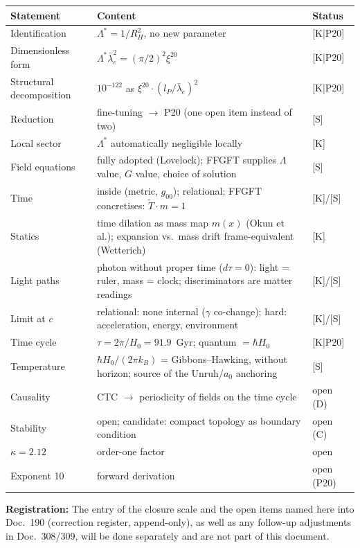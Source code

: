 \documentclass[11pt]{report}
\begin{document}
\begin{center}
\begin{tabular}{lp{6.5cm}l}
\toprule
Statement & Content & Status \\
\midrule
Identification & $\Lambda^{*} = 1/R_H^2$, no new parameter
  & [K|P20] \\
Dimensionless form & $\Lambda^{*}\bar\lambda_e^2 = (\pi/2)^2\xi^{20}$
  & [K|P20] \\
Structural decomposition & $10^{-122}$ as $\xi^{20}\cdot(l_P/\bar\lambda_e)^2$
  & [K|P20] \\
Reduction & fine-tuning $\to$ P20 (one open item instead of two)
  & [S] \\
Local sector & $\Lambda^{*}$ automatically negligible locally
  & [K] \\
Field equations & fully adopted (Lovelock); FFGFT supplies
  $\Lambda$ value, $G$ value, choice of solution & [S] \\
Time & inside (metric, $g_{00}$); relational; FFGFT concretises:
  $\tilde T \cdot m = 1$ & [K]/[S] \\
Statics & time dilation as mass map $m(x)$ (Okun et al.);
  expansion vs.\ mass drift frame-equivalent (Wetterich) & [K] \\
Light paths & photon without proper time ($d\tau=0$): light =
  ruler, mass = clock; discriminators are matter readings & [K]/[S] \\
Limit at $c$ & relational: none internal ($\gamma$ co-change);
  hard: acceleration, energy, environment & [K]/[S] \\
Time cycle & $\tau = 2\pi/H_0 = 91.9$~Gyr; quantum $= \hbar H_0$
  & [K|P20] \\
Temperature & $\hbar H_0/(2\pi k_B)$ = Gibbons--Hawking, without
  horizon; source of the Unruh/$a_0$ anchoring & [S] \\
Causality & CTC $\to$ periodicity of fields on the time cycle
  & open (D) \\
Stability & open; candidate: compact topology as boundary condition
  & open (C) \\
$\kappa = 2.12$ & order-one factor & open \\
Exponent 10 & forward derivation & open (P20) \\
\bottomrule
\end{tabular}
\end{center}

\medskip
\noindent\textbf{Registration:} The entry of the closure scale and
the open items named here into Doc.~190 (correction register,
append-only), as well as any follow-up adjustments in Doc.~308/309,
will be done separately and are not part of this document.
\end{document}
